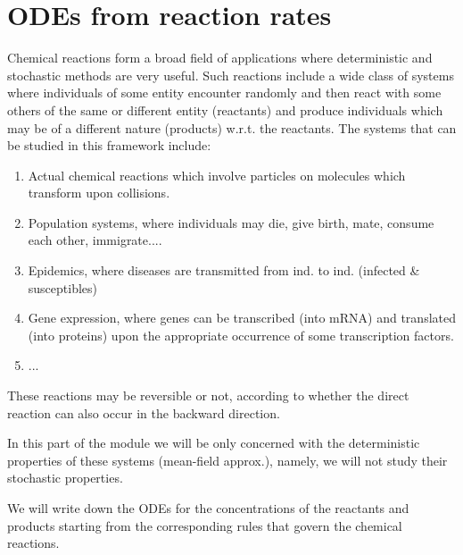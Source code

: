 
\section{ODEs from reaction rates}
Chemical reactions form a broad field of applications where deterministic and
stochastic methods are very useful. Such reactions include a wide class of
systems where individuals of some entity encounter randomly and then react with
some others of the same or different entity (reactants) and produce individuals
which may be of a different nature (products) w.r.t. the reactants. The systems
that can be studied in this framework include:

\begin{enumerate}
    \item Actual chemical reactions which involve particles on molecules which
    transform upon collisions.
    \item Population systems, where individuals may die, give birth, mate,
    consume each other, immigrate....
    \item Epidemics, where diseases are transmitted from ind. to ind. (infected
    & susceptibles)
    \item Gene expression, where genes can be transcribed (into mRNA) and
    translated (into proteins) upon the appropriate occurrence of some
    transcription factors.
    \item ...
\end{enumerate}

These reactions may be reversible or not, according to whether the direct
reaction can also occur in the backward direction.

In this part of the module we will be only concerned with the deterministic
properties of these systems (mean-field approx.), namely, we will not study
their stochastic properties.

We will write down the ODEs for the concentrations of the reactants and
products starting from the corresponding rules that govern the chemical
reactions.

